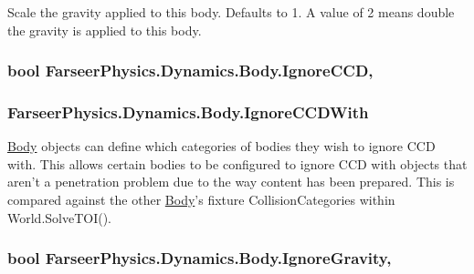 Scale the gravity applied to this body. Defaults to 1. A value of 2 means double the gravity is applied to this body. 

\hypertarget{class_farseer_physics_1_1_dynamics_1_1_body_a990dae318ffb5c7f5b1750014e75f494}{
\subsubsection[{Ignore\+C\+C\+D}]{\setlength{\rightskip}{0pt plus 5cm}bool Farseer\+Physics.\+Dynamics.\+Body.\+Ignore\+C\+C\+D\hspace{0.3cm}{\ttfamily [get]}, {\ttfamily [set]}}}\label{class_farseer_physics_1_1_dynamics_1_1_body_a990dae318ffb5c7f5b1750014e75f494}
\hypertarget{class_farseer_physics_1_1_dynamics_1_1_body_aee9c3d9420664f0197aaeb4c49454098}{
\subsubsection[{Ignore\+C\+C\+D\+With}]{ Farseer\+Physics.\+Dynamics.\+Body.\+Ignore\+C\+C\+D\+With\hspace{0.3cm}{\ttfamily [set]}}}\label{class_farseer_physics_1_1_dynamics_1_1_body_aee9c3d9420664f0197aaeb4c49454098}


\hyperlink{class_farseer_physics_1_1_dynamics_1_1_body}{Body} objects can define which categories of bodies they wish to ignore C\+C\+D with. This allows certain bodies to be configured to ignore C\+C\+D with objects that aren't a penetration problem due to the way content has been prepared. This is compared against the other \hyperlink{class_farseer_physics_1_1_dynamics_1_1_body}{Body}'s fixture Collision\+Categories within World.\+Solve\+T\+O\+I(). 

\hypertarget{class_farseer_physics_1_1_dynamics_1_1_body_ad83498f3542a081b6dbaba625d4c8720}{
\subsubsection[{Ignore\+Gravity}]{\setlength{\rightskip}{0pt plus 5cm}bool Farseer\+Physics.\+Dynamics.\+Body.\+Ignore\+Gravity\hspace{0.3cm}{\ttfamily [get]}, {\ttfamily [set]}}}\label{class_farseer_physics_1_1_dynamics_1_1_body_ad83498f3542a081b6dbaba625d4c8720}


